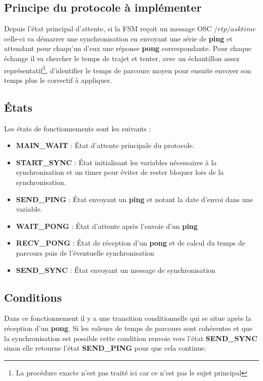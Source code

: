 \subsection{Principe du protocole à implémenter}
Depuis l'état principal d'attente, si la FSM reçoit un message OSC $/rtp/asktime$ celle-ci va démarrer une synchronisation en envoyant une série de \textbf{ping} et attendant pour chaqu'un d'eux une réponse \textbf{pong} correspondante. Pour chaque échange il va chercher le temps de trajet et tenter, avec un échantillon assez représentatif\footnote{La procédure exacte n'est pas traité ici car ce n'est pas le sujet principal}, d'identifier le temps de parcours moyen pour ensuite envoyer son temps plus le correctif à appliquer.
\subsection{États}
Les états de fonctionnements sont les suivants :\\
\begin{itemize}
\item \textbf{MAIN\_WAIT} : État d'attente principale du protocole.
\item \textbf{START\_SYNC} : État initialisant les variables nécessaires à la synchronisation et un timer pour éviter de rester bloquer lors de la synchronisation.
\item \textbf{SEND\_PING} : État envoyant un \textbf{ping} et notant la date d'envoi dans une variable.
\item \textbf{WAIT\_PONG} : État d'attente après l'envoie d'un \textbf{ping}
\item \textbf{RECV\_PONG} : État de réception d'un \textbf{pong} et de calcul du temps de parcours puis de l'éventuelle synchronisation
\item \textbf{SEND\_SYNC} : État envoyant un message de synchronisation 
\end{itemize}

\subsection{Conditions}
Dans ce fonctionnement il y a une transition conditionnelle qui se situe après la réception d'un \textbf{pong}. Si les valeurs de temps de parcours sont cohérentes et que la synchronisation est possible cette condition renvoie vers l'état \textbf{SEND\_SYNC} sinon elle retourne l'état \textbf{SEND\_PING} pour que cela continue.

